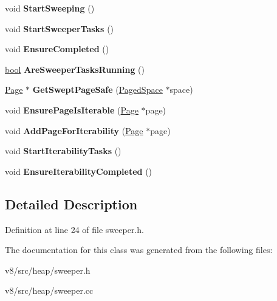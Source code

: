 \begin{DoxyCompactItemize}
\item 
\mbox{\label{classv8_1_1internal_1_1Sweeper_accf2894afba95fe932c05334349a7a8a}} 
void {\bfseries Start\+Sweeping} ()
\item 
\mbox{\label{classv8_1_1internal_1_1Sweeper_a0863b5bf8d851dd7b793da8b807d3a7f}} 
void {\bfseries Start\+Sweeper\+Tasks} ()
\item 
\mbox{\label{classv8_1_1internal_1_1Sweeper_a04405f7360f8c25619667af5a85232d7}} 
void {\bfseries Ensure\+Completed} ()
\item 
\mbox{\label{classv8_1_1internal_1_1Sweeper_a071083b193311719d6f14e64a6386377}} 
\mbox{\hyperlink{classbool}{bool}} {\bfseries Are\+Sweeper\+Tasks\+Running} ()
\item 
\mbox{\label{classv8_1_1internal_1_1Sweeper_ac55ccd9ec0a1281412fcc1ffd634af23}} 
\mbox{\hyperlink{classv8_1_1internal_1_1Page}{Page}} $\ast$ {\bfseries Get\+Swept\+Page\+Safe} (\mbox{\hyperlink{classv8_1_1internal_1_1PagedSpace}{Paged\+Space}} $\ast$space)
\item 
\mbox{\label{classv8_1_1internal_1_1Sweeper_a192b5bd090db7f2e107653b71c6dbb48}} 
void {\bfseries Ensure\+Page\+Is\+Iterable} (\mbox{\hyperlink{classv8_1_1internal_1_1Page}{Page}} $\ast$page)
\item 
\mbox{\label{classv8_1_1internal_1_1Sweeper_ac4f8de279b0074856ade5a321fe183d0}} 
void {\bfseries Add\+Page\+For\+Iterability} (\mbox{\hyperlink{classv8_1_1internal_1_1Page}{Page}} $\ast$page)
\item 
\mbox{\label{classv8_1_1internal_1_1Sweeper_a24211bd4993d151b7da13f8f24cce93d}} 
void {\bfseries Start\+Iterability\+Tasks} ()
\item 
\mbox{\label{classv8_1_1internal_1_1Sweeper_ad5b16fdd37c2e011e6bd69874a33008f}} 
void {\bfseries Ensure\+Iterability\+Completed} ()
\end{DoxyCompactItemize}


\subsection{Detailed Description}


Definition at line 24 of file sweeper.\+h.



The documentation for this class was generated from the following files\+:\begin{DoxyCompactItemize}
\item 
v8/src/heap/sweeper.\+h\item 
v8/src/heap/sweeper.\+cc\end{DoxyCompactItemize}
